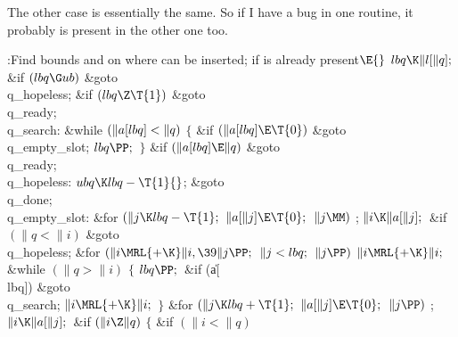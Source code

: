 The other case is essentially the same. So if I have a bug
in
one routine, it probably is present in the other one too.

\Y\B\4:Find bounds  and  on where  can be
inserted;  if  is already present\X${}\E{}$\6
$\\{lbq}\K\|l[\|q];{}$\6
\&{if} ${}(\\{lbq}\G\\{ub}){}$\1\5
\&{goto} \\{q\_hopeless};\2\6
\&{if} ${}(\\{lbq}\Z\T{1}){}$\1\5
\&{goto} \\{q\_ready};\2\6
\4\\{q\_search}:\5
\&{while} ${}(\|a[\\{lbq}]<\|q){}$\5
${}\{{}$\1\6
\&{if} ${}(\|a[\\{lbq}]\E\T{0}){}$\1\5
\&{goto} \\{q\_empty\_slot};\2\6
${}\\{lbq}\PP;{}$\6
\4${}\}{}$\2\6
\&{if} ${}(\|a[\\{lbq}]\E\|q){}$\1\5
\&{goto} \\{q\_ready};\2\6
\4\\{q\_hopeless}:\5
${}\\{ubq}\K\\{lbq}-\T{1}{}$;\5
\&{goto} \\{q\_done};\6
\4\\{q\_empty\_slot}:\5
\&{for} ${}(\|j\K\\{lbq}-\T{1};{}$ ${}\|a[\|j]\E\T{0};{}$ ${}\|j\MM){}$\1\5
;\2\6
${}\|i\K\|a[\|j];{}$\6
\&{if} ${}(\|q<\|i){}$\1\5
\&{goto} \\{q\_hopeless};\2\6
\&{for} ${}(\|i\MRL{+{\K}}\|i,\39\|j\PP;{}$ ${}\|j<\\{lbq};{}$ ${}\|j\PP){}$\1\5
${}\|i\MRL{+{\K}}\|i;{}$\2\6
\&{while} ${}(\|q>\|i){}$\5
${}\{{}$\1\6
${}\\{lbq}\PP;{}$\6
\&{if} (\|a[\\{lbq}])\1\5
\&{goto} \\{q\_search};\2\6
${}\|i\MRL{+{\K}}\|i;{}$\6
\4${}\}{}$\2\6
\&{for} ${}(\|j\K\\{lbq}+\T{1};{}$ ${}\|a[\|j]\E\T{0};{}$ ${}\|j\PP){}$\1\5
;\2\6
${}\|i\K\|a[\|j];{}$\6
\&{if} ${}(\|i\Z\|q){}$\5
${}\{{}$\1\6
\&{if} ${}(\|i<\|q){}$\5
